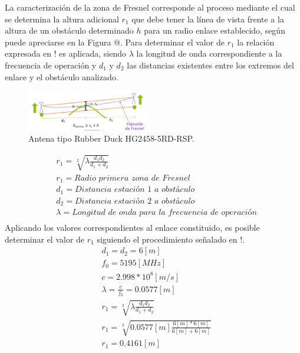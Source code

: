 \documentclass[conference]{IEEEtran}
\begin{document}
La caracterización de la zona de Fresnel corresponde al proceso mediante el cual se determina la altura adicional $r_1$ que debe tener la línea de vista
frente a la altura de un obstáculo determinado $h$ para un radio enlace establecido, según puede apreciarse en la Figura @. Para determinar el valor de $r_1$ la 
relación expresada en ! es aplicada, siendo $\lambda$ la longitud de onda correspondiente a la frecuencia de operación y $d_1$ y $d_2$ las distancias existentes
entre los extremos del enlace y el obstáculo analizado.
\begin{figure}
    \centering
          \includegraphics[width=0.47\textwidth]{Fresnel.png}
        \caption{Antena tipo Rubber Duck HG2458-5RD-RSP.
        }
        \label{fig:Fresnel}
\end{figure}
\begin{equation}
    \label{eq:Eq1}
    \begin{aligned}
        &r_{1} = \sqrt[2]{\lambda\frac{d_1d_2}{d_1+d_2}}\\
        &r_{1} = \textit{Radio primera zona de Fresnel}\\
        &d_{1} = \textit{Distancia estación 1 a obstáculo}\\
        &d_{2} = \textit{Distancia estación 2 a obstáculo}\\
        &\lambda = \textit{Longitud de onda para la frecuencia de operación}\\
    \end{aligned}
\end{equation}
Aplicando los valores correspondientes al enlace constituido, es posible determinar el valor de $r_1$ siguiendo el procedimiento
señalado en !.
\begin{equation}
    \label{eq:Eq2}
    \begin{aligned}
        &d_1=d_2=6[m]\\
        &f_0 = 5195[MHz]\\
        &c = 2.998*10^{8}[m/s]\\
        &\lambda = \frac{c}{f_0}=0.0577[m]\\
        &r_{1} = \sqrt[2]{\lambda\frac{d_1d_2}{d_1+d_2}}\\
        &r_{1} = \sqrt[2]{0.0577[m]\frac{6[m]*6[m]}{6[m]+6[m]}}\\
        &r_{1} = 0.4161[m]\\
    \end{aligned}
\end{equation}
\end{document}
